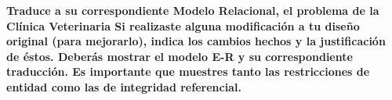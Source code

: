 \textbf{Traduce a su correspondiente Modelo Relacional, el problema de la Clínica Veterinaria Si realizaste alguna
modificación a tu diseño original (para mejorarlo), indica los cambios hechos y la justificación de éstos. Deberás
mostrar el modelo E-R y su correspondiente traducción. Es importante que muestres tanto las restricciones de
entidad como las de integridad referencial.}\vspace{.3cm}

